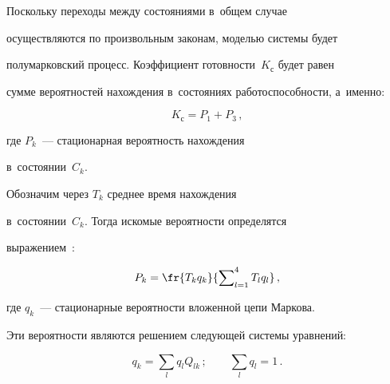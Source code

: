    Поскольку переходы между состояниями в~общем случае 


осуществляются по произвольным законам, моделью системы будет 


полумарковский процесс. Коэффициент готовности~$K_{\mathrm{с}}$ будет равен 


сумме вероятностей нахождения в~состояниях работоспособности, а~именно:





\noindent


   $$


   K_{\mathrm{с}}= P_1+P_3\,,


   $$


где $P_k$~--- стационарная вероятность нахождения 


в~состоянии~$C_k$.


   


   Обозначим через $T_k$ среднее время нахождения 


   в~состоянии~$C_k$. Тогда искомые вероятности определятся 


выражением~\cite{4-bor, 6-bor}:





\vspace*{2pt}





\noindent


   $$


   P_k= \fr{T_k q_k}{\sum\nolimits_{l=1}^4 T_l q_l}\,,


   $$


   


   \vspace*{-2pt}


   


   \noindent


где $q_k$~--- стационарные вероятности вложенной цепи Маркова. 


Эти вероятности являются решением следующей системы уравнений:


\begin{equation}


q_k = \sum\limits_l q_l Q_{lk}\,; \qquad 


 \sum\limits_l q_l  =1\,.


\label{e1-bor}


\end{equation}


